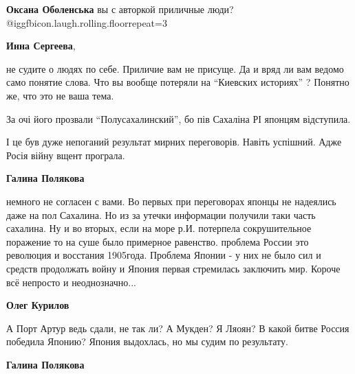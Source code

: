 \begin{itemize}
\begin{itemize}
\begin{itemize}
\textbf{Оксана Оболенська} вы с авторкой приличные люди? @igg{fbicon.laugh.rolling.floor}{repeat=3} 

\textbf{Инна Сергеева}, 

не судите о людях по себе. Приличие вам не присуще. Да и вряд ли вам ведомо
само понятие слова. Что вы вообще потеряли на \enquote{Киевских историях} ?
Понятно же, что это не ваша тема.

\end{itemize} %

\end{itemize} %

За очі його прозвали \enquote{Полусахалинский}, бо пів Сахаліна РІ японцям відступила.

\begin{itemize} %

І це був дуже непоганий результат мирних переговорів. Навіть успішний. Адже
Росія війну вщент програла.

\begin{itemize} %
\textbf{Галина Полякова} 

немного не согласен с вами. Во первых при переговорах японцы не надеялись даже
на пол Сахалина. Но из за утечки информации получили таки часть сахалина. Ну и
во вторых, если на море р.И. потерпела сокрушительное поражение то на суше было
примерное равенство. проблема России это революция и восстания 1905года.
Проблема Японии - у них не было сил и средств продолжать войну и Япония первая
стремилась заключить мир. Короче всё непросто и неоднозначно...


\textbf{Олег Курилов} 

А Порт Артур ведь сдали, не так ли? А Мукден? Я Ляоян? В какой битве Россия
победила Японию? Япония выдохлась, но мы судим по результату.

\textbf{Галина Полякова} 


\end{itemize}
\end{itemize}
\end{itemize}
